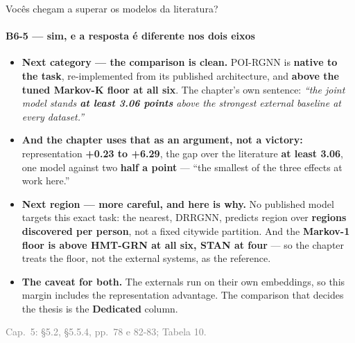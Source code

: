 \documentclass{beamer}
\begin{document}
\begin{frame}[noframenumbering]{Vocês chegam a superar os modelos da literatura?}
    \framesubtitle{B6-5 --- sim, e a resposta é diferente nos dois eixos}
    \hypertarget{b65}{}
    \footnotesize\begin{itemize}\setlength{\itemsep}{3pt}\setlength{\parskip}{0pt}
        \item \textbf{\color{primaryshade}Next category --- the comparison is clean.} POI-RGNN is
              \textbf{native to the task}, re-implemented from its published architecture, and
              \textbf{above the tuned Markov-K floor at all six}. The chapter's own sentence:
              \textit{``the joint model stands \textbf{at least 3.06 points} above the strongest
              external baseline at every dataset.''}
        \item \textbf{And the chapter uses that as an argument, not a victory:} representation
              \textbf{+0.23 to +6.29}, the gap over the literature \textbf{at least 3.06}, one model
              against two \textbf{half a point} --- \alert{``the smallest of the three effects at
              work here.''}
        \item \textbf{\color{alertshade}Next region --- more careful, and here is why.} No published
              model targets this exact task: the nearest, DRRGNN, predicts region over
              \textbf{regions discovered per person}, not a fixed citywide partition. And the
              \textbf{Markov-1 floor is above HMT-GRN at all six, STAN at four} --- so the chapter
              treats \alert{the floor, not the external systems}, as the reference.
        \item \textbf{The caveat for both.} The externals run on their own embeddings, so this
              margin \alert{includes the representation advantage}. The comparison that decides the
              thesis is the \textbf{Dedicated} column.
    \end{itemize}
    \vfill
    {\scriptsize
    \begin{minipage}[b]{0.775\linewidth}\raggedright\textcolor{gray}{Cap.~5: §5.2, §5.5.4, pp.~78 e 82-83; Tabela 10.}\end{minipage}\hfill
    \begin{minipage}[b]{0.20\linewidth}\raggedleft \hyperlink{b0}{}\end{minipage}}
\end{frame}
\end{document}
